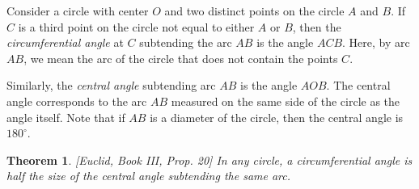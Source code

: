 \documentclass[12pt]{article}
\newtheorem{thm}{Theorem}
\begin{document}
Consider a circle with center $O$ and two distinct points on the circle $A$ and $B$. If $C$ is a third point on the circle not equal to either $A$ or $B$, then the \emph{circumferential angle} at $C$ subtending the arc $AB$ is the angle $ACB$. Here, by arc $AB$, we mean the arc of the circle that does not contain the points $C$.

Similarly, the \emph{central angle} subtending arc $AB$ is the angle $AOB$. The central angle corresponds to the arc $AB$ measured on the same side of the circle as the angle itself. Note that if $AB$ is a diameter of the circle, then the central angle is $180^{\circ}$.

\begin{thm} \emph{[Euclid, Book III, Prop. 20]} In any circle, a circumferential angle is half the size of the central angle subtending the same arc.
\end{thm}
\end{document}
